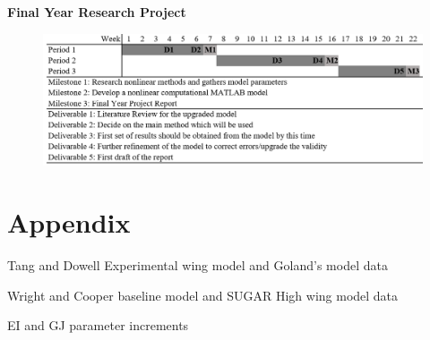 \documentclass[11pt]{article}
\begin{document}
\textbf{Final Year Research Project}
\begin{figure}[H]
    \centering
    \includegraphics[width = .9\textwidth]{figures/fyp.png}
\end{figure}

\cleardoublepage

\newpage

\cleardoublepage

\section*{Appendix}

\begin{table}[H]
    \centering
    \caption{Tang and Dowell Experimental wing model\cite{Tang2001ExperimentalWings} and Goland's model \cite{CHETANNICHKAWDE2006NONLINEARCONTINUATION} data}
    
    \label{tab:TandD-exp-wing-data}
\end{table}
\begin{table}[H]
    \centering
    \caption{Wright and Cooper \cite{Wright2015INTRODUCTIONLOADS} baseline model and SUGAR High wing model \cite{Bradley2015SubsonicExploration} data}
    
    \label{tab:Goland-wing-data}
\end{table}

\begin{table}[H]
    \centering
    \caption{EI and GJ parameter increments}
    
    \label{tab:ei-gj}
\end{table}
\end{document}

